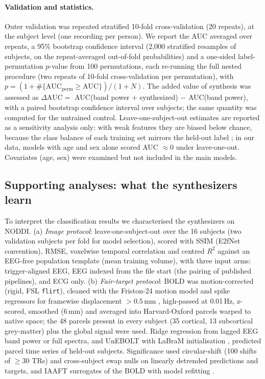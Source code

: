 \documentclass[11pt]{article}
\begin{document}
\paragraph{Validation and statistics.}
Outer validation was repeated stratified 10-fold cross-validation (20 repeats), at the subject level (one recording per person).
We report the AUC averaged over repeats, a 95\% bootstrap confidence interval (2,000 stratified resamples of subjects, on the repeat-averaged out-of-fold probabilities) and a one-sided label-permutation $p$-value from 100 permutations, each re-running the full nested procedure (two repeats of 10-fold cross-validation per permutation), with $p=(1+\#\{\mathrm{AUC}_{\mathrm{perm}}\geq\mathrm{AUC}\})/(1+N)$.
The added value of synthesis was assessed as $\Delta\mathrm{AUC} =$ AUC(band power + synthesized) $-$ AUC(band power), with a paired bootstrap confidence interval over subjects; the same quantity was computed for the untrained control.
Leave-one-subject-out estimates are reported as a sensitivity analysis only: with weak features they are biased below chance, because the class balance of each training set mirrors the held-out label \citep{varoquaux2018}; in our data, models with age and sex alone scored AUC $\approx0$ under leave-one-out.
Covariates (age, sex) were examined but not included in the main models.

\subsection{Supporting analyses: what the synthesizers learn}\label{sec:fid_methods}
To interpret the classification results we characterised the synthesizers on NODDI.
(a) \emph{Image protocol}: leave-one-subject-out over the 16 subjects (two validation subjects per fold for model selection), scored with SSIM (E2fNet convention), RMSE, voxelwise temporal correlation and centred $R^2$ against an EEG-free population template (mean training volume), with three input arms: trigger-aligned EEG, EEG indexed from the file start (the pairing of published pipelines), and ECG only.
(b) \emph{Fair-target protocol}: BOLD was motion-corrected (rigid, FSL \texttt{flirt}), cleaned with the Friston-24 motion model and spike regressors for framewise displacement $>0.5$\,mm \citep{friston1996,power2014}, high-passed at 0.01\,Hz, z-scored, smoothed (6\,mm) and averaged into Harvard-Oxford parcels warped to native space; the 48 parcels present in every subject (35 cortical, 13 subcortical grey-matter) plus the global signal were used.
Ridge regression from lagged EEG band power or full spectra, and UnEBOLT \citep{li2026unebolt} with LaBraM initialisation \citep{jiang2022labram}, predicted parcel time series of held-out subjects.
Significance used circular-shift (100 shifts of $\geq30$ TRs) and cross-subject swap nulls on linearly detrended predictions and targets, and IAAFT surrogates of the BOLD with model refitting \citep{schreiber1996,mehta2025eegfmri}.
\end{document}

